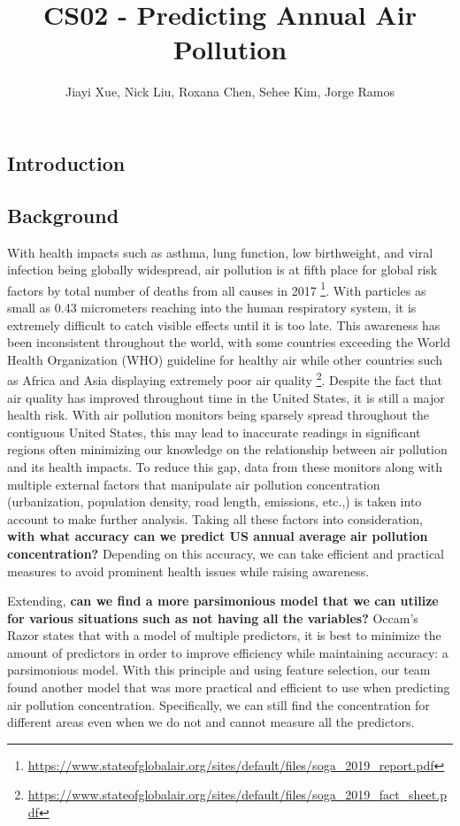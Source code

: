 \documentclass[
]{article}
\title{CS02 - Predicting Annual Air Pollution}
\author{Jiayi Xue, Nick Liu, Roxana Chen, Sehee Kim, Jorge Ramos}
\date{}
\begin{document}
\maketitle

{
\setcounter{tocdepth}{2}
\tableofcontents
}
\subsection{Introduction}\label{introduction}

\subsection{Background}\label{background}

With health impacts such as asthma, lung function, low birthweight, and
viral infection being globally widespread, air pollution is at fifth
place for global risk factors by total number of deaths from all causes
in 2017 \footnote{\url{https://www.stateofglobalair.org/sites/default/files/soga_2019_report.pdf}}.
With particles as small as 0.43 micrometers reaching into the human
respiratory system, it is extremely difficult to catch visible effects
until it is too late. This awareness has been inconsistent throughout
the world, with some countries exceeding the World Health Organization
(WHO) guideline for healthy air while other countries such as Africa and
Asia displaying extremely poor air quality \footnote{\url{https://www.stateofglobalair.org/sites/default/files/soga_2019_fact_sheet.pdf}}.
Despite the fact that air quality has improved throughout time in the
United States, it is still a major health risk. With air pollution
monitors being sparsely spread throughout the contiguous United States,
this may lead to inaccurate readings in significant regions often
minimizing our knowledge on the relationship between air pollution and
its health impacts. To reduce this gap, data from these monitors along
with multiple external factors that manipulate air pollution
concentration (urbanization, population density, road length, emissions,
etc.,) is taken into account to make further analysis. Taking all these
factors into consideration, \textbf{with what accuracy can we predict US
annual average air pollution concentration?} Depending on this accuracy,
we can take efficient and practical measures to avoid prominent health
issues while raising awareness.

Extending, \textbf{can we find a more parsimonious model that we can
utilize for various situations such as not having all the variables?}
Occam's Razor states that with a model of multiple predictors, it is
best to minimize the amount of predictors in order to improve efficiency
while maintaining accuracy: a parsimonious model. With this principle
and using feature selection, our team found another model that was more
practical and efficient to use when predicting air pollution
concentration. Specifically, we can still find the concentration for
different areas even when we do not and cannot measure all the
predictors.
\end{document}

